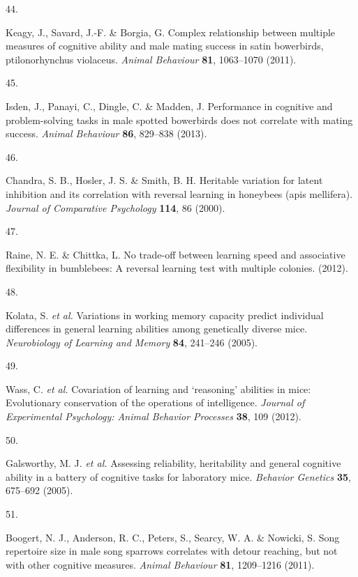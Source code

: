 \documentclass[
  man,floatsintext]{apa6}
\newlength{\cslhangindent}
\newlength{\csllabelwidth}
\newlength{\cslentryspacingunit} %
\newenvironment{CSLReferences}[2] %
 {%
  \setlength{\parindent}{0pt}
  \ifodd #1
  \let\oldpar\par
  \def\par{\hangindent=\cslhangindent\oldpar}
  \fi
  \setlength{\parskip}{#2\cslentryspacingunit}
 }%
 {}
\newcommand{\CSLLeftMargin}[1]{\parbox[t]{\csllabelwidth}{#1}}
\newcommand{\CSLRightInline}[1]{\parbox[t]{\linewidth - \csllabelwidth}{#1}\break}
\begin{document}
\begin{CSLReferences}{0}{0}
\leavevmode{}%
\CSLLeftMargin{44. }%
\CSLRightInline{Keagy, J., Savard, J.-F. \& Borgia, G. Complex relationship between multiple measures of cognitive ability and male mating success in satin bowerbirds, ptilonorhynchus violaceus. \emph{Animal Behaviour} \textbf{81}, 1063--1070 (2011).}

\leavevmode{}%
\CSLLeftMargin{45. }%
\CSLRightInline{Isden, J., Panayi, C., Dingle, C. \& Madden, J. Performance in cognitive and problem-solving tasks in male spotted bowerbirds does not correlate with mating success. \emph{Animal Behaviour} \textbf{86}, 829--838 (2013).}

\leavevmode{}%
\CSLLeftMargin{46. }%
\CSLRightInline{Chandra, S. B., Hosler, J. S. \& Smith, B. H. Heritable variation for latent inhibition and its correlation with reversal learning in honeybees (apis mellifera). \emph{Journal of Comparative Psychology} \textbf{114}, 86 (2000).}

\leavevmode{}%
\CSLLeftMargin{47. }%
\CSLRightInline{Raine, N. E. \& Chittka, L. No trade-off between learning speed and associative flexibility in bumblebees: A reversal learning test with multiple colonies. (2012).}

\leavevmode{}%
\CSLLeftMargin{48. }%
\CSLRightInline{Kolata, S. \emph{et al.} Variations in working memory capacity predict individual differences in general learning abilities among genetically diverse mice. \emph{Neurobiology of Learning and Memory} \textbf{84}, 241--246 (2005).}

\leavevmode{}%
\CSLLeftMargin{49. }%
\CSLRightInline{Wass, C. \emph{et al.} Covariation of learning and {`reasoning'} abilities in mice: Evolutionary conservation of the operations of intelligence. \emph{Journal of Experimental Psychology: Animal Behavior Processes} \textbf{38}, 109 (2012).}

\leavevmode{}%
\CSLLeftMargin{50. }%
\CSLRightInline{Galsworthy, M. J. \emph{et al.} Assessing reliability, heritability and general cognitive ability in a battery of cognitive tasks for laboratory mice. \emph{Behavior Genetics} \textbf{35}, 675--692 (2005).}

\leavevmode{}%
\CSLLeftMargin{51. }%
\CSLRightInline{Boogert, N. J., Anderson, R. C., Peters, S., Searcy, W. A. \& Nowicki, S. Song repertoire size in male song sparrows correlates with detour reaching, but not with other cognitive measures. \emph{Animal Behaviour} \textbf{81}, 1209--1216 (2011).}


\end{CSLReferences}
\end{document}
